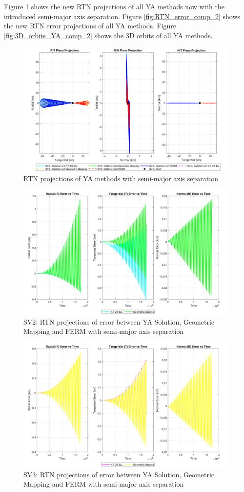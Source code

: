 Figure \ref{fig:RTN_comp_2} shows the new RTN projections of all YA methods now with the introduced semi-major axis separation. Figure \ref{fig:RTN_error_comp_2} shows the new RTN error projections of all YA methods. Figure \ref{fig:3D_orbits_YA_comp_2} shows the 3D orbits of all YA methods. 

\begin{figure}[H]
    \centering
    \includegraphics[width=0.7\linewidth]{sim/figures/PS3/RTN_projections_YA_comparison_2.png}
    \caption{RTN projections of YA methods with semi-major axis separation}
    \label{fig:RTN_comp_2}
\end{figure}
\begin{figure}[H]
    \centering
    \includegraphics[width=0.7\linewidth]{sim/figures/PS3/RTN_error_over_time_YA_comparison_SV2_2.png}
    \caption{SV2: RTN projections of error between YA Solution, Geometric Mapping and FERM with semi-major axis separation}
    \label{fig:RTN_error_comp_SV2_2}
\end{figure}
\begin{figure}[H]
    \centering
    \includegraphics[width=0.7\linewidth]{sim/figures/PS3/RTN_error_over_time_YA_comparison_SV3_2.png}
    \caption{SV3: RTN projections of error between YA Solution, Geometric Mapping and FERM with semi-major axis separation}
    \label{fig:RTN_error_comp_SV3_2}
\end{figure}
